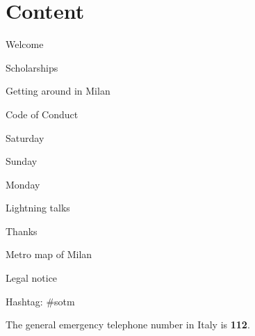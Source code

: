 \section*{Content}

\vspace*{0.35em}%
\noindent Welcome\dotfill \pageref{welcome}

\vspace*{0.35em}%
\noindent Scholarships \dotfill \pageref{scholarships}

\vspace*{0.35em}%
\noindent Getting around in Milan \dotfill \pageref{getting-around}

\vspace*{0.35em}%
\noindent Code of Conduct \dotfill \pageref{coc}

\vspace*{0.35em}%
\noindent Saturday \dotfill \pageref{saturday}

\vspace*{0.35em}%
\noindent Sunday \dotfill \pageref{sunday}

\vspace*{0.35em}%
\noindent Monday \dotfill \pageref{monday}

\vspace*{0.35em}%
\noindent Lightning talks \dotfill \pageref{lightning-talks}

\vspace*{0.35em}%
\noindent Thanks \dotfill \pageref{thanks}

\vspace*{0.35em}%
\noindent Metro map of Milan \dotfill \pageref{metromap}

\vspace*{0.35em}%
\noindent Legal notice \dotfill \pageref{legal}

\vfill
\noindent
Hashtag: \#sotm

\vspace*{0.8em}%
\noindent
The general emergency telephone number in Italy is \textbf{112}.
\vfill

\newpage
